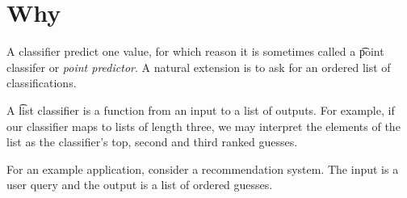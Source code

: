 

\section*{Why}

A classifier predict one value, for which reason it is sometimes called a \t{point classifer} or \textit{point predictor}.
A natural extension is to ask for an ordered list of classifications.

A \t{list classifier} is a function from an input to a list of outputs.
For example, if our classifier maps to lists of length three, we may interpret the elements of the list as the classifier's top, second and third ranked guesses.

For an example application, consider a recommendation system.
The input is a user query and the output is a list of ordered guesses.


\blankpage
